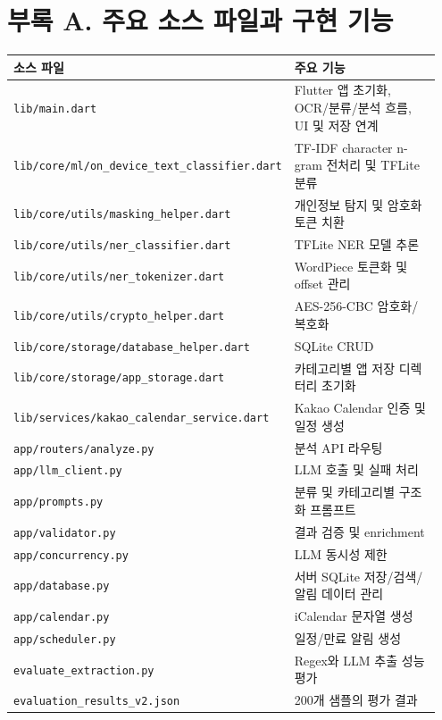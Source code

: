 \documentclass[11pt,a4paper]{article}
\begin{document}
\newpage

\section*{부록 A. 주요 소스 파일과 구현 기능}

\begingroup
\renewcommand{\arraystretch}{1.25}
\begin{longtable}{>{\raggedright\arraybackslash\small}p{0.44\linewidth} >{\raggedright\arraybackslash\small}p{0.51\linewidth}}
\toprule
\textbf{소스 파일} & \textbf{주요 기능}\\
\midrule
\texttt{lib/main.dart} & Flutter 앱 초기화, OCR/분류/분석 흐름, UI 및 저장 연계\\
\texttt{lib/\allowbreak core/\allowbreak ml/\allowbreak on\_device\_\allowbreak text\_classifier.dart} & TF-IDF character n-gram 전처리 및 TFLite 분류\\
\texttt{lib/\allowbreak core/\allowbreak utils/\allowbreak masking\_helper.dart} & 개인정보 탐지 및 암호화 토큰 치환\\
\texttt{lib/\allowbreak core/\allowbreak utils/\allowbreak ner\_classifier.dart} & TFLite NER 모델 추론\\
\texttt{lib/\allowbreak core/\allowbreak utils/\allowbreak ner\_tokenizer.dart} & WordPiece 토큰화 및 offset 관리\\
\texttt{lib/\allowbreak core/\allowbreak utils/\allowbreak crypto\_helper.dart} & AES-256-CBC 암호화/복호화\\
\texttt{lib/\allowbreak core/\allowbreak storage/\allowbreak database\_helper.dart} & SQLite CRUD\\
\texttt{lib/\allowbreak core/\allowbreak storage/\allowbreak app\_storage.dart} & 카테고리별 앱 저장 디렉터리 초기화\\
\texttt{lib/\allowbreak services/\allowbreak kakao\_calendar\_\allowbreak service.dart} & Kakao Calendar 인증 및 일정 생성\\
\texttt{app/\allowbreak routers/\allowbreak analyze.py} & 분석 API 라우팅\\
\texttt{app/\allowbreak llm\_client.py} & LLM 호출 및 실패 처리\\
\texttt{app/\allowbreak prompts.py} & 분류 및 카테고리별 구조화 프롬프트\\
\texttt{app/\allowbreak validator.py} & 결과 검증 및 enrichment\\
\texttt{app/\allowbreak concurrency.py} & LLM 동시성 제한\\
\texttt{app/\allowbreak database.py} & 서버 SQLite 저장/검색/알림 데이터 관리\\
\texttt{app/\allowbreak calendar.py} & iCalendar 문자열 생성\\
\texttt{app/\allowbreak scheduler.py} & 일정/만료 알림 생성\\
\texttt{evaluate\_\allowbreak extraction.py} & Regex와 LLM 추출 성능 평가\\
\texttt{evaluation\_\allowbreak results\_\allowbreak v2.json} & 200개 샘플의 평가 결과\\
\bottomrule
\end{longtable}
\end{document}
